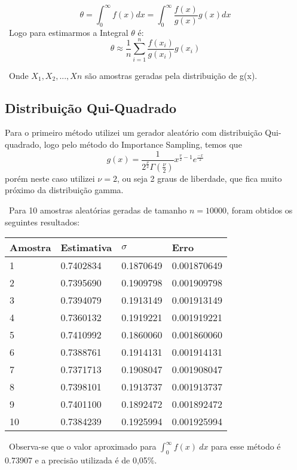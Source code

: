 \documentclass{article} %
\begin{document}
\ $$\theta = \int_{0}^{\infty} f(x) dx = \int_{0}^{\infty} \frac{f(x)}{g(x)} g(x) dx$$
\ Logo para estimarmos a Integral $\theta$ é:
\ $$ \hat{\theta} \approx \frac{1}{n} \sum_{i=1}^{n}  \frac{f(x_{i})}{g(x_{i})} g(x_{i})$$

\ Onde $X_{1},X_{2},...,X{n}$ são amostras geradas pela distribuição de g(x).

\subsection{Distribuição Qui-Quadrado}

\qquad  Para o primeiro método utilizei um gerador aleatório com distribuição Qui-quadrado, logo pelo método do Importance Sampling, temos que $$g(x) = \frac{1}{2^\frac{\nu}{2}\Gamma(\frac{\nu}{2})}x^{\frac{\nu}{2}-1} e^{\frac{-x}{2}}$$ porém neste caso utilizei $\nu = 2$, ou seja 2 graus de liberdade, que fica muito próximo da distribuição gamma.

\ Para 10 amostras aleatórias geradas de tamanho $n = 10000$, foram obtidos os seguintes resultados:

\begin{table}[ht]
\begin{center}
\begin{tabular}{llll}
\hline
Amostra & Estimativa & $\sigma$ & Erro \\
\hline
1 & 0.7402834 & 0.1870649 & 0.001870649\\
2 & 0.7395690 & 0.1909798 & 0.001909798\\
3 & 0.7394079 & 0.1913149 & 0.001913149\\
4 & 0.7360132 & 0.1919221 & 0.001919221\\
5 & 0.7410992 & 0.1860060 & 0.001860060\\
6 & 0.7388761 & 0.1914131 & 0.001914131\\
7 & 0.7371713 & 0.1908047 & 0.001908047\\
8 & 0.7398101 & 0.1913737 & 0.001913737\\
9 & 0.7401100 & 0.1892472 & 0.001892472\\
10 & 0.7384239 & 0.1925994 & 0.001925994\\
\hline
\end{tabular}
\end{center}
\end{table}

\ Observa-se que o valor aproximado para $\int_{0}^{\infty} f(x) \ dx$ para esse método é 0.73907 e a precisão utilizada é de 0,05\%.
\end{document}
